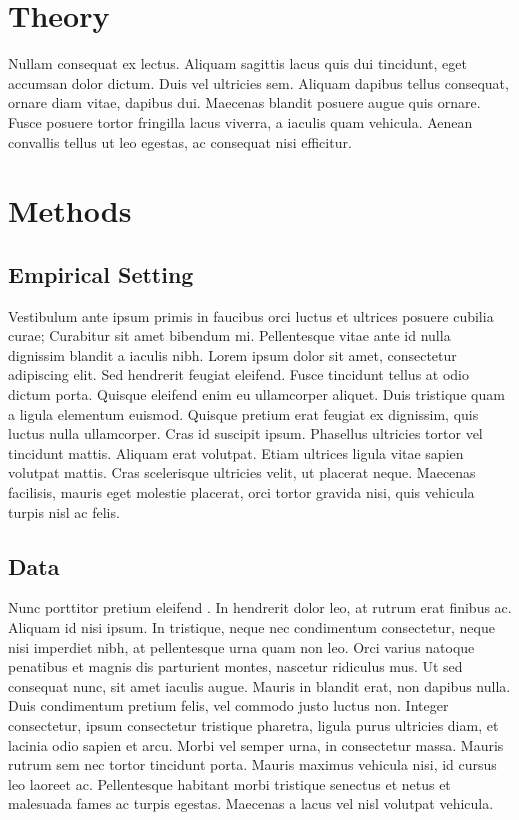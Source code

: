 \documentclass[12pt,letterpaper]{article} %
\begin{document}
\section*{Theory}
Nullam consequat ex lectus. Aliquam sagittis lacus quis dui tincidunt, eget accumsan dolor dictum. Duis vel ultricies sem. Aliquam dapibus tellus consequat, ornare diam vitae, dapibus dui. Maecenas blandit posuere augue quis ornare. Fusce posuere tortor fringilla lacus viverra, a iaculis quam vehicula. Aenean convallis tellus ut leo egestas, ac consequat nisi efficitur.

\section*{Methods}
\subsection*{Empirical Setting}
 Vestibulum ante ipsum primis in faucibus orci luctus et ultrices posuere cubilia curae; Curabitur sit amet bibendum mi. Pellentesque vitae ante id nulla dignissim blandit a iaculis nibh. Lorem ipsum dolor sit amet, consectetur adipiscing elit. Sed hendrerit feugiat eleifend. Fusce tincidunt tellus at odio dictum porta. Quisque eleifend enim eu ullamcorper aliquet. Duis tristique quam a ligula elementum euismod. Quisque pretium erat feugiat ex dignissim, quis luctus nulla ullamcorper. Cras id suscipit ipsum. Phasellus ultricies tortor vel tincidunt mattis. Aliquam erat volutpat. Etiam ultrices ligula vitae sapien volutpat mattis. Cras scelerisque ultricies velit, ut placerat neque. Maecenas facilisis, mauris eget molestie placerat, orci tortor gravida nisi, quis vehicula turpis nisl ac felis.
 
\subsection*{Data}
Nunc porttitor pretium eleifend \citep{sinatra_quantifying_2016}. In hendrerit dolor leo, at rutrum erat finibus ac. Aliquam id nisi ipsum. In tristique, neque nec condimentum consectetur, neque nisi imperdiet nibh, at pellentesque urna quam non leo. Orci varius natoque penatibus et magnis dis parturient montes, nascetur ridiculus mus. Ut sed consequat nunc, sit amet iaculis augue. Mauris in blandit erat, non dapibus nulla. Duis condimentum pretium felis, vel commodo justo luctus non. Integer consectetur, ipsum consectetur tristique pharetra, ligula purus ultricies diam, et lacinia odio sapien et arcu. Morbi vel semper urna, in consectetur massa. Mauris rutrum sem nec tortor tincidunt porta. Mauris maximus vehicula nisi, id cursus leo laoreet ac. Pellentesque habitant morbi tristique senectus et netus et malesuada fames ac turpis egestas. Maecenas a lacus vel nisl volutpat vehicula.
\end{document}
